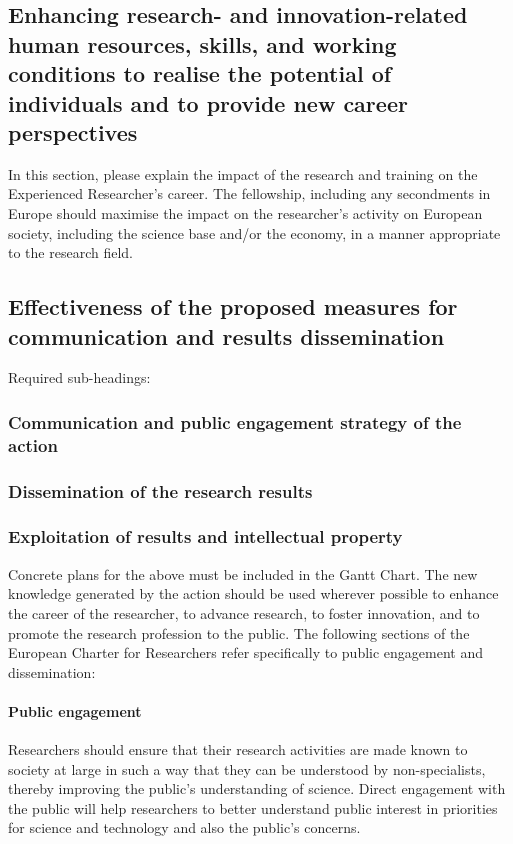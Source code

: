 \documentclass[a4paper,11pt]{article}
\begin{document}
\subsection{Enhancing research- and innovation-related human resources, skills, and working conditions to realise the potential of individuals and to provide new career perspectives}
\label{sec:enhancement}

In this section, please explain the impact of the research and training on the Experienced Researcher's career. The fellowship, including any secondments in Europe should maximise the impact on the researcher's activity on European society, including the science base and/or the economy, in a manner appropriate to the research field. 

\subsection{Effectiveness of the proposed measures for communication and results dissemination}

Required sub-headings: 

\subsubsection*{Communication and public engagement strategy of the action}
\subsubsection*{Dissemination of the research results}
\subsubsection*{Exploitation of results and intellectual property}

Concrete plans for the above must be included in the Gantt Chart. The new knowledge generated by the action should be used wherever possible to enhance the career of the researcher, to advance research, to foster innovation, and to promote the research profession to the public. 
The following sections of the European Charter for Researchers refer specifically to public engagement and dissemination:

\paragraph{Public engagement}
Researchers should ensure that their research activities are made known to society at large in such a way that they can be understood by non-specialists, thereby improving the public's understanding of science. Direct engagement with the public will help researchers to better understand public interest in priorities for science and technology and also the public's concerns. 
\end{document}
